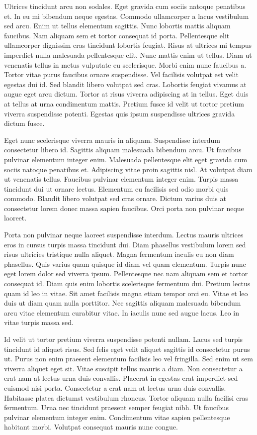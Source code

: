 \documentclass[11pt,a4paper]{article}
\begin{document}
Ultrices tincidunt arcu non sodales. Eget gravida cum sociis natoque penatibus et. In eu mi bibendum neque egestas. Commodo ullamcorper a lacus vestibulum sed arcu. Enim ut tellus elementum sagittis. Nunc lobortis mattis aliquam faucibus. Nam aliquam sem et tortor consequat id porta. Pellentesque elit ullamcorper dignissim cras tincidunt lobortis feugiat. Risus at ultrices mi tempus imperdiet nulla malesuada pellentesque elit. Nunc mattis enim ut tellus. Diam ut venenatis tellus in metus vulputate eu scelerisque. Morbi enim nunc faucibus a. Tortor vitae purus faucibus ornare suspendisse. Vel facilisis volutpat est velit egestas dui id. Sed blandit libero volutpat sed cras. Lobortis feugiat vivamus at augue eget arcu dictum. Tortor at risus viverra adipiscing at in tellus. Eget duis at tellus at urna condimentum mattis. Pretium fusce id velit ut tortor pretium viverra suspendisse potenti. Egestas quis ipsum suspendisse ultrices gravida dictum fusce.

Eget nunc scelerisque viverra mauris in aliquam. Suspendisse interdum consectetur libero id. Sagittis aliquam malesuada bibendum arcu. Ut faucibus pulvinar elementum integer enim. Malesuada pellentesque elit eget gravida cum sociis natoque penatibus et. Adipiscing vitae proin sagittis nisl. At volutpat diam ut venenatis tellus. Faucibus pulvinar elementum integer enim. Turpis massa tincidunt dui ut ornare lectus. Elementum eu facilisis sed odio morbi quis commodo. Blandit libero volutpat sed cras ornare. Dictum varius duis at consectetur lorem donec massa sapien faucibus. Orci porta non pulvinar neque laoreet.

Porta non pulvinar neque laoreet suspendisse interdum. Lectus mauris ultrices eros in cursus turpis massa tincidunt dui. Diam phasellus vestibulum lorem sed risus ultricies tristique nulla aliquet. Magna fermentum iaculis eu non diam phasellus. Quis varius quam quisque id diam vel quam elementum. Turpis nunc eget lorem dolor sed viverra ipsum. Pellentesque nec nam aliquam sem et tortor consequat id. Diam quis enim lobortis scelerisque fermentum dui. Pretium lectus quam id leo in vitae. Sit amet facilisis magna etiam tempor orci eu. Vitae et leo duis ut diam quam nulla porttitor. Nec sagittis aliquam malesuada bibendum arcu vitae elementum curabitur vitae. In iaculis nunc sed augue lacus. Leo in vitae turpis massa sed.

Id velit ut tortor pretium viverra suspendisse potenti nullam. Lacus sed turpis tincidunt id aliquet risus. Sed felis eget velit aliquet sagittis id consectetur purus ut. Purus non enim praesent elementum facilisis leo vel fringilla. Sed enim ut sem viverra aliquet eget sit. Vitae suscipit tellus mauris a diam. Non consectetur a erat nam at lectus urna duis convallis. Placerat in egestas erat imperdiet sed euismod nisi porta. Consectetur a erat nam at lectus urna duis convallis. Habitasse platea dictumst vestibulum rhoncus. Tortor aliquam nulla facilisi cras fermentum. Urna nec tincidunt praesent semper feugiat nibh. Ut faucibus pulvinar elementum integer enim. Condimentum vitae sapien pellentesque habitant morbi. Volutpat consequat mauris nunc congue.
\end{document}
